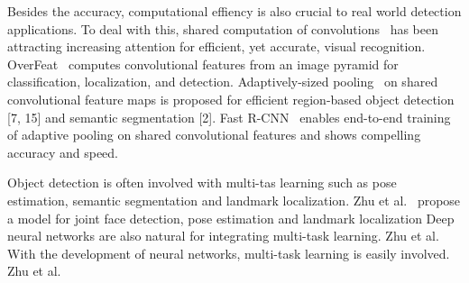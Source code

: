 Besides the accuracy, computational effiency is also crucial to real world detection applications. To deal with this, shared computation of convolutions~\cite{sermanet2013overfeat, he2014spatial, ren2015faster, long2015fully} has been attracting increasing attention for efficient, yet accurate, visual recognition. OverFeat~\cite{sermanet2013overfeat} computes convolutional features from an image pyramid for classification, localization, and detection. Adaptively-sized pooling~\cite{he2014spatial} on shared convolutional feature maps is proposed for efficient region-based object detection [7, 15] and semantic segmentation [2]. Fast R-CNN~\cite{ren2015faster} enables end-to-end training of adaptive pooling on shared convolutional features and shows compelling accuracy and speed.

Object detection is often involved with multi-tas learning such as pose estimation, semantic segmentation and landmark localization. Zhu et al.~\cite{2012face} propose a model for joint face detection, pose estimation and landmark localization 
Deep neural networks are also natural for integrating multi-task learning. Zhu et al.~\cite{2012face}
With the development of neural networks, multi-task learning is easily involved. Zhu et al.~\cite{zhu2012face} 
